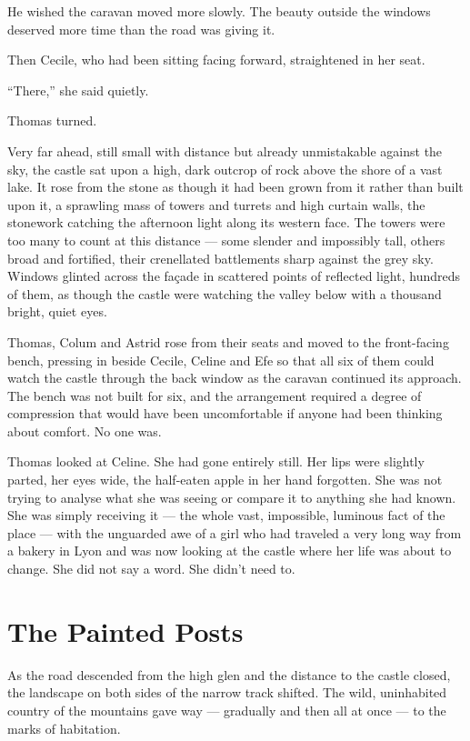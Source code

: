 He wished the caravan moved more slowly. The beauty outside the windows deserved more time than the road was giving it.
 
Then Cecile, who had been sitting facing forward, straightened in her seat.
 
\enquote{There,} she said quietly.
 
Thomas turned.
 
Very far ahead, still small with distance but already unmistakable against the sky, the castle sat upon a high, dark outcrop of rock above the shore of a vast lake. It rose from the stone as though it had been grown from it rather than built upon it, a sprawling mass of towers and turrets and high curtain walls, the stonework catching the afternoon light along its western face. The towers were too many to count at this distance --- some slender and impossibly tall, others broad and fortified, their crenellated battlements sharp against the grey sky. Windows glinted across the façade in scattered points of reflected light, hundreds of them, as though the castle were watching the valley below with a thousand bright, quiet eyes.
 
Thomas, Colum and Astrid rose from their seats and moved to the front-facing bench, pressing in beside  Cecile, Celine and Efe so that all six of them could watch the castle through the back window as the caravan continued its approach. The bench was not built for six, and the arrangement required a degree of compression that would have been uncomfortable if anyone had been thinking about comfort. No one was.
 
Thomas looked at Celine. She had gone entirely still. Her lips were slightly parted, her eyes wide, the half-eaten apple in her hand forgotten. She was not trying to analyse what she was seeing or compare it to anything she had known. She was simply receiving it --- the whole vast, impossible, luminous fact of the place --- with the unguarded awe of a girl who had traveled a very long way from a bakery in Lyon and was now looking at the castle where her life was about to change. She did not say a word. She didn't need to.
 
\section*{The Painted Posts}
 
As the road descended from the high glen and the distance to the castle closed, the landscape on both sides of the narrow track shifted. The wild, uninhabited country of the mountains gave way --- gradually and then all at once --- to the marks of habitation.
 
